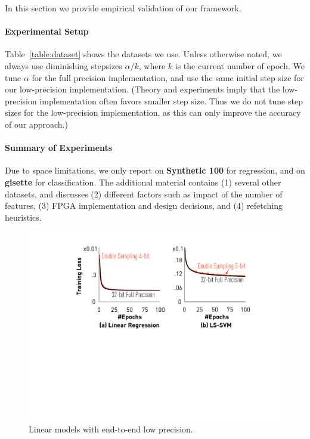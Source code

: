 \documentclass{article}
\begin{document}
\vspace{-0.5em}
In this section we provide empirical validation of
our framework.

\vspace{-1em}
\paragraph{Experimental Setup} 
Table~\ref{table:dataset} shows the 
datasets we use. 
Unless otherwise noted, we always
use diminishing stepsizes $\alpha/k$,
where $k$ is the current number of
epoch. We tune 
$\alpha$ for the full precision
implementation, and use the
same initial step size for 
our low-precision 
implementation. (Theory and
experiments imply that the low-precision
implementation often favors smaller step size. 
Thus we do not tune step sizes for the low-precision 
implementation, as this can only improve the accuracy of our approach.) 

\vspace{-1em}
\paragraph*{Summary of Experiments}
Due to space limitations, we only report on {\bf Synthetic 100} for regression, and on 
{\bf gisette} for classification. 
The additional material contains (1) several other datasets, 
and discusses (2) different
factors such as impact of the number of features, 
(3) FPGA implementation and design
decisions, and (4) refetching heuristics.


\begin{figure}[t]
\centering
\includegraphics[width=0.7\columnwidth]{final-experiments/linearmodel} 
\vspace{-1em}
\caption{Linear models with end-to-end low precision.}
\vspace{-1.5em}
\label{fig:convergence}
\end{figure}
\end{document}
